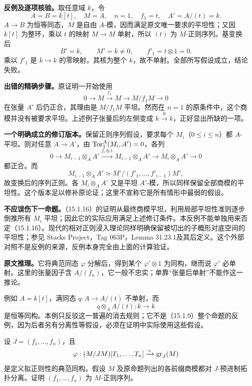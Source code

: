 \textbf{反例及逐项核验。}取任意域 $k$，令
\[
 A=B=k[t],\quad M=A,\quad n=1,\quad f_1=t,
 \quad A'=A/(t)=k.
\]
$A\to B$ 为恒等同态，$M$ 是自由 $A$-模，因而满足原文唯一要求的平坦性；又因 $k[t]$ 为整环，乘以 $t$ 的映射 $M\to M$ 单射，所以 $(t)$ 为 $M$-正则序列。基变换后
\[
 B'=k,
 \qquad M'=k\ne0,
 \qquad f'_1=t\otimes1=0.
\]
乘以 $f'_1$ 是 $k\to k$ 的零映射，其核为整个 $k$，故不单射。全部所写假设成立，结论失败。

\textbf{出错的精确步骤。}原证明一开始使用
\[
 0\longrightarrow M\xrightarrow{f_1}M\longrightarrow M/f_1M\longrightarrow0
\]
在张量 $A'$ 后仍正合，其理由是 $M/f_1M$ 平坦。然而在 $n=1$ 的原条件中，这个商模并没有被要求平坦。上述例子张量后的左侧变成 $k\xrightarrow{0}k$，正好显出所缺的一项。

\textbf{一个明确成立的修订版本。}保留正则序列假设，要求每个 $M_i$（$0\leq i\leq n$）都 $A$-平坦。则对任意 $A\to A'$，由 $\operatorname{Tor}_1^A(M_i,A')=0$，各列
\[
 0\to M_{i-1}\otimes_AA'
 \xrightarrow{f_i\otimes1}M_{i-1}\otimes_AA'
 \to M_i\otimes_AA'\to0
\]
都正合。而
\[
 M_{i-1}\otimes_AA'
 \simeq M'/(f'_1,\ldots,f'_{i-1})M',
\]
故变换后的序列正则。各 $M_i\otimes_AA'$ 又是平坦 $A'$-模，所以同样保留全部商模的平坦性。这个版本足以修补原论证；这里不宣称它是所有情形中最弱的假设。

\textbf{不应误伤下一命题。}（15.1.16）的证明从最终商模平坦，利用局部平坦性准则逐步倒推所有 $M_i$ 平坦；因此它的实际应用满足上述修订条件。本反例不能单独用来否定（15.1.16）。现代的相对正则浸入理论同样明确保留被切出的子概形对底空间的平坦性；参见 Stacks Project，Tag 063P，Lemma 31.23.1及其后定义。这个外部对照不是反例的来源，反例本身完全由上面的计算验证。

\textbf{原文推理。}它将典范同态 $\varphi$ 分解后，得到某个 $\varphi'\otimes1$ 为同构，继而说 $\varphi'$ 必单射。这里的张量因子含 $A/(f_n)$，它一般不忠实；单靠“张量后单射”不能作这一推论。

例如 $A=k[t]$，满同态 $q:A\to A/(t)$ 不单射，而
\[
 q\otimes_AA/(t):k\longrightarrow k
\]
是恒等同构。本例只反驳这一普遍的消去规则；它不是（15.1.9）整个命题的反例，因为后者另有分离性等假设，必须在证明中实际使用这些假设。

设 $J=(f_1,\ldots,f_n)$，且
\[
 \varphi:(M/JM)[T_1,\ldots,T_n]\xrightarrow{\sim}\operatorname{gr}_J(M)
\]
是定义拟正则性的典范同构。假设 $M$ 及原命题列出的各前缀商模都对 $J$-预进制拓扑分离。证明 $(f_1,\ldots,f_n)$ 为 $M$-正则序列。

